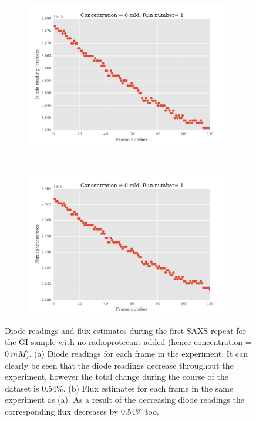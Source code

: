 \begin{figure}
    \centering
    \begin{subfigure}[b]{1.0\textwidth}
            \centering
            \includegraphics[width=\textwidth]{figures/saxs/np_diode_readings.pdf}
            \caption{}
            \label{fig:Diode readings}
    \end{subfigure}
    \\
    \begin{subfigure}[b]{1.0\textwidth}
            \centering
            \includegraphics[width=\textwidth]{figures/saxs/np_flux_estimates.pdf}
            \caption{}
            \label{fig:Flux estimates}
    \end{subfigure}
    \caption{Diode readings and flux estimates during the first SAXS repeat for the GI sample with no radioprotecant added (hence concentration = $0\ mM$).
    (a) Diode readings for each frame in the experiment.
    It can clearly be seen that the diode readings decrease throughout the experiment, however the total change during the course of the dataset is 0.54\%.
    (b) Flux estimates for each frame in the same experiment as (a).
    As a result of the decreasing diode readings the corresponding flux decreases by 0.54\% too.}
    \label{fig:Diode and flux readings}
\end{figure}

